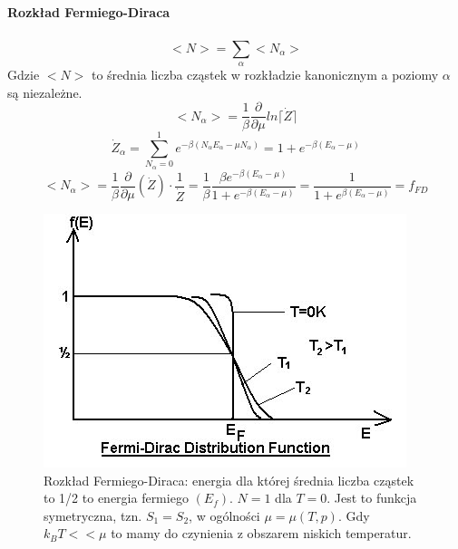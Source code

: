 \documentclass{article}
\begin{document}
		\paragraph{Rozkład Fermiego-Diraca}
		\begin{equation}
		<N> = \sum_{\alpha}^{}<N_\alpha>
		\end{equation}
		Gdzie $ <N> $ to średnia liczba cząstek w rozkładzie kanonicznym a poziomy $ \alpha $ są niezależne.
		\begin{equation}
		<N_\alpha > = \frac{1}{\beta}\frac{\partial}{\partial \mu} ln \lceil \dot{Z} \rceil
		\end{equation}
		\begin{equation}
		\dot{Z}_\alpha = \sum_{N_\alpha = 0}^{1}e^{-\beta(N_\alpha E_\alpha - \mu N_\alpha)} = 
		1 + e^{-\beta (E_\alpha - \mu)}
		\end{equation}
		\begin{equation}
		<N_\alpha> = \frac{1}{\beta}\frac{\partial}{\partial \mu}(\dot{Z}) \cdot \frac{1}{\dot{Z}} = 
		 \frac{1}{\beta}\frac{\beta e^{-\beta (E_\alpha - \mu)}}{1 + e^{-\beta (E_\alpha - \mu)}} = 
		 \frac{1}{1 + e^{\beta (E_\alpha - \mu)}} = f_{FD}
		\end{equation}
		\begin{figure}[ht]
			\label{fig:fig1}
			\centering
			\includegraphics[scale=0.5]{fermi_dirac.jpg}
			\caption{Rozkład Fermiego-Diraca: energia dla której średnia liczba cząstek to 1/2 to energia fermiego $ (E_f) $. $ N = 1 $ dla $ T = 0 $. Jest to funkcja symetryczna, tzn. $ S_1 = S_2 $, w ogólności $ \mu = \mu(T, p) $. Gdy $ k_BT << \mu $ to mamy do czynienia z obszarem niskich temperatur.}
		\end{figure}	
\end{document}
